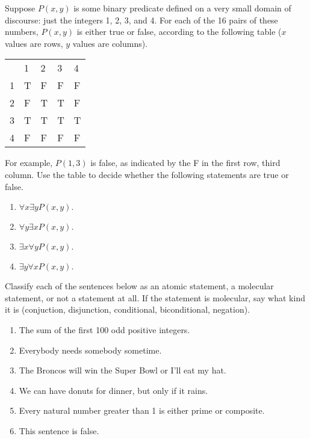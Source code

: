 \documentclass[11pt,]{book}
\theoremstyle{ptxplainnotitle}
\theoremstyle{ptxplaintitle}
\theoremstyle{ptxdefinitionnotitle}
\theoremstyle{ptxdefinitiontitle}
\theoremstyle{ptxdefinitionnotitle}
\theoremstyle{ptxdefinitiontitle}
\theoremstyle{ptxdefinitionnotitle}
\theoremstyle{ptxdefinitiontitle}
\theoremstyle{ptxdefinitiontitlenonumber}
\theoremstyle{ptxdefinitiontitlenonumber}
\numberwithin{equation}{chapter}
\begin{document}
\begin{divisionexercise}{10}\hypertarget{exercise-158}{}
\hypertarget{p-2128}{}%
Suppose \(P(x,y)\) is some binary predicate defined on a very small domain of discourse: just the integers 1, 2, 3, and 4.  For each of the 16 pairs of these numbers, \(P(x,y)\) is either true or false, according to the following table (\(x\) values are rows, \(y\) values are columns).%
\begin{sidebyside}{1}{0}{0}{0}
\begin{sbspanel}{1}
{\centering%
\begin{tabular}{lllll}
&1&2&3&4\tabularnewline[0pt]
1&T&F&F&F\tabularnewline[0pt]
2&F&T&T&F\tabularnewline[0pt]
3&T&T&T&T\tabularnewline[0pt]
4&F&F&F&F
\end{tabular}
\par}
\end{sbspanel}
\end{sidebyside}
\par
\hypertarget{p-2129}{}%
For example, \(P(1,3)\) is false, as indicated by the F in the first row, third column.  Use the table to decide whether the following statements are true or false. \leavevmode%
\begin{enumerate}[label=\alph*.]
\item\hypertarget{li-1064}{}\hypertarget{p-2130}{}%
\(\forall x \exists y P(x,y)\text{.}\) %
\item\hypertarget{li-1069}{}\hypertarget{p-2135}{}%
\(\forall y \exists x P(x,y)\text{.}\) %
\item\hypertarget{li-1074}{}\hypertarget{p-2140}{}%
\(\exists x \forall y P(x,y)\text{.}\) %
\item\hypertarget{li-1079}{}\hypertarget{p-2145}{}%
\(\exists y \forall x P(x,y)\text{.}\) %
\end{enumerate}
%
\end{divisionexercise}%
\begin{divisionexercise}{11}\hypertarget{exercise-159}{}
\hypertarget{p-2155}{}%
Classify each of the sentences below as an atomic statement, a molecular statement, or not a statement at all.  If the statement is molecular, say what kind it is (conjuction, disjunction, conditional, biconditional, negation). \leavevmode%
\begin{enumerate}[label=(\alph*)]
\item\hypertarget{li-1088}{}The sum of the first 100 odd positive integers.%
\item\hypertarget{li-1089}{}Everybody needs somebody sometime.%
\item\hypertarget{li-1090}{}The Broncos will win the Super Bowl or I'll eat my hat.%
\item\hypertarget{li-1091}{}We can have donuts for dinner, but only if it rains.%
\item\hypertarget{li-1092}{}Every natural number greater than 1 is either prime or composite.%
\item\hypertarget{li-1093}{}This sentence is false.%
\end{enumerate}
%
\end{divisionexercise}%
\end{document}
